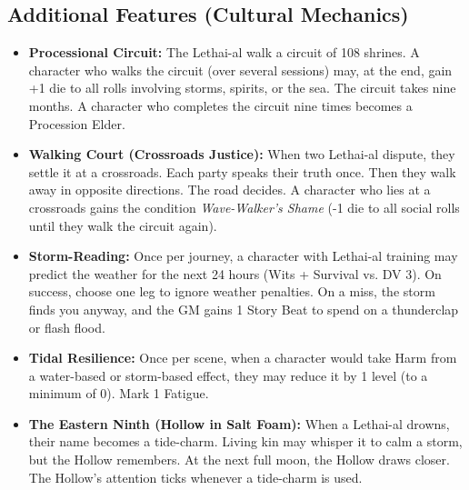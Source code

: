 \subsection*{Additional Features (Cultural Mechanics)}
\label{sec:lethai-al-mechanics}

\begin{itemize}
\item \textbf{Processional Circuit:} The Lethai-al walk a circuit of 108 shrines. A character who walks the circuit (over several sessions) may, at the end, gain +1 die to all rolls involving storms, spirits, or the sea. The circuit takes nine months. A character who completes the circuit nine times becomes a Procession Elder.
\item \textbf{Walking Court (Crossroads Justice):} When two Lethai-al dispute, they settle it at a crossroads. Each party speaks their truth once. Then they walk away in opposite directions. The road decides. A character who lies at a crossroads gains the condition \textit{Wave-Walker's Shame} (-1 die to all social rolls until they walk the circuit again).
\item \textbf{Storm-Reading:} Once per journey, a character with Lethai-al training may predict the weather for the next 24 hours (Wits + Survival vs. DV 3). On success, choose one leg to ignore weather penalties. On a miss, the storm finds you anyway, and the GM gains 1 Story Beat to spend on a thunderclap or flash flood.
\item \textbf{Tidal Resilience:} Once per scene, when a character would take Harm from a water-based or storm-based effect, they may reduce it by 1 level (to a minimum of 0). Mark 1 Fatigue.
\item \textbf{The Eastern Ninth (Hollow in Salt Foam):} When a Lethai-al drowns, their name becomes a tide-charm. Living kin may whisper it to calm a storm, but the Hollow remembers. At the next full moon, the Hollow draws closer. The Hollow's attention ticks whenever a tide-charm is used.
\end{itemize}

